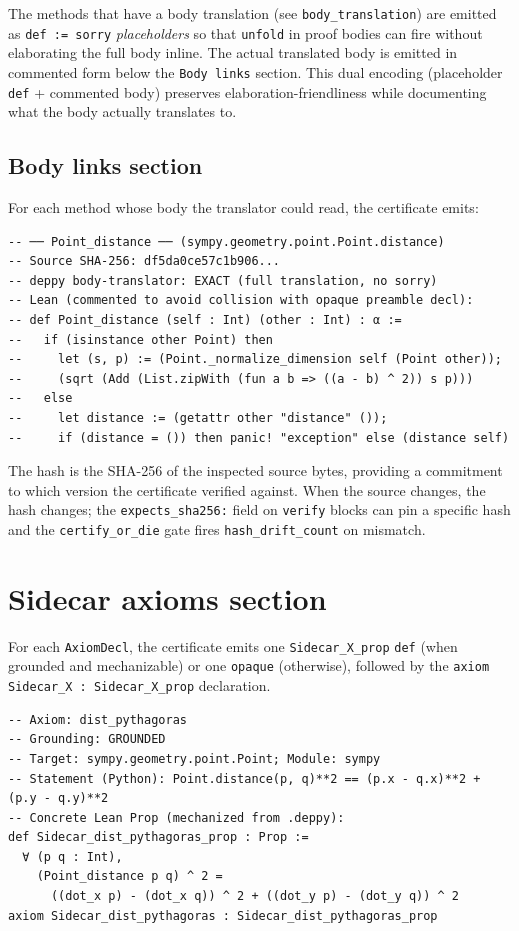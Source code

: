The methods that have a body translation (see
\texttt{body\_translation}) are emitted as \texttt{def := sorry}
\emph{placeholders} so that \texttt{unfold} in proof bodies can
fire without elaborating the full body inline.  The actual
translated body is emitted in commented form below the
\texttt{Body links} section.  This dual encoding (placeholder
\texttt{def} + commented body) preserves elaboration-friendliness
while documenting what the body actually translates to.

\subsection{Body links section}

For each method whose body the translator could read, the
certificate emits:
\begin{lstlisting}[language=lean4]
-- ── Point_distance ── (sympy.geometry.point.Point.distance)
-- Source SHA-256: df5da0ce57c1b906...
-- deppy body-translator: EXACT (full translation, no sorry)
-- Lean (commented to avoid collision with opaque preamble decl):
-- def Point_distance (self : Int) (other : Int) : α :=
--   if (isinstance other Point) then
--     let (s, p) := (Point._normalize_dimension self (Point other));
--     (sqrt (Add (List.zipWith (fun a b => ((a - b) ^ 2)) s p)))
--   else
--     let distance := (getattr other "distance" ());
--     if (distance = ()) then panic! "exception" else (distance self)
\end{lstlisting}

The hash is the SHA-256 of the inspected source bytes, providing a
commitment to which version the certificate verified against.  When
the source changes, the hash changes; the
\texttt{expects\_sha256:} field on \texttt{verify} blocks can pin a
specific hash and the \texttt{certify\_or\_die} gate fires
\texttt{hash\_drift\_count} on mismatch.

\section{Sidecar axioms section}
\label{sec:axioms-section}

For each \texttt{AxiomDecl}, the certificate emits one
\texttt{Sidecar\_X\_prop} \texttt{def} (when grounded and
mechanizable) or one \texttt{opaque} (otherwise), followed by the
\texttt{axiom Sidecar\_X : Sidecar\_X\_prop} declaration.

\begin{lstlisting}[language=lean4]
-- Axiom: dist_pythagoras
-- Grounding: GROUNDED
-- Target: sympy.geometry.point.Point; Module: sympy
-- Statement (Python): Point.distance(p, q)**2 == (p.x - q.x)**2 + (p.y - q.y)**2
-- Concrete Lean Prop (mechanized from .deppy):
def Sidecar_dist_pythagoras_prop : Prop :=
  ∀ (p q : Int),
    (Point_distance p q) ^ 2 =
      ((dot_x p) - (dot_x q)) ^ 2 + ((dot_y p) - (dot_y q)) ^ 2
axiom Sidecar_dist_pythagoras : Sidecar_dist_pythagoras_prop
\end{lstlisting}

